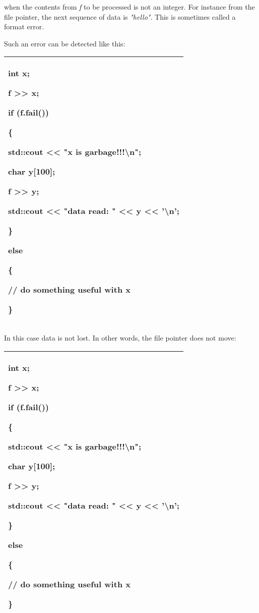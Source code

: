 \documentclass[
]{article}
\begin{document}
when the contents from \emph{f} to be processed is not an integer. For
instance from the file pointer, the next sequence of data is
\emph{"hello"}. This is sometimes called a format error.

Such an error can be detected like this:

\begin{longtable}[]{@{}l@{}}
\toprule
\endhead
\begin{minipage}[t]{0.97\columnwidth}\raggedright
int x;

f \textgreater\textgreater{} x;

if (f.fail())

\{

std::cout \textless\textless{} "x is garbage!!!\textbackslash n";

char y{[}100{]};

f \textgreater\textgreater{} y;

std::cout \textless\textless{} "data read: " \textless\textless{} y
\textless\textless{} '\textbackslash n';

\}

else

\{

// do something useful with x

\}\strut
\end{minipage}\tabularnewline
\bottomrule
\end{longtable}

In this case data is not lost. In other words, the file pointer does not
move:

\begin{longtable}[]{@{}l@{}}
\toprule
\endhead
\begin{minipage}[t]{0.97\columnwidth}\raggedright
int x;

f \textgreater\textgreater{} x;

if (f.fail())

\{

std::cout \textless\textless{} "x is garbage!!!\textbackslash n";

char y{[}100{]};

f \textgreater\textgreater{} y;

std::cout \textless\textless{} "data read: " \textless\textless{} y
\textless\textless{} '\textbackslash n';

\}

else

\{

// do something useful with x

\}\strut
\end{minipage}\tabularnewline
\bottomrule
\end{longtable}
\end{document}
